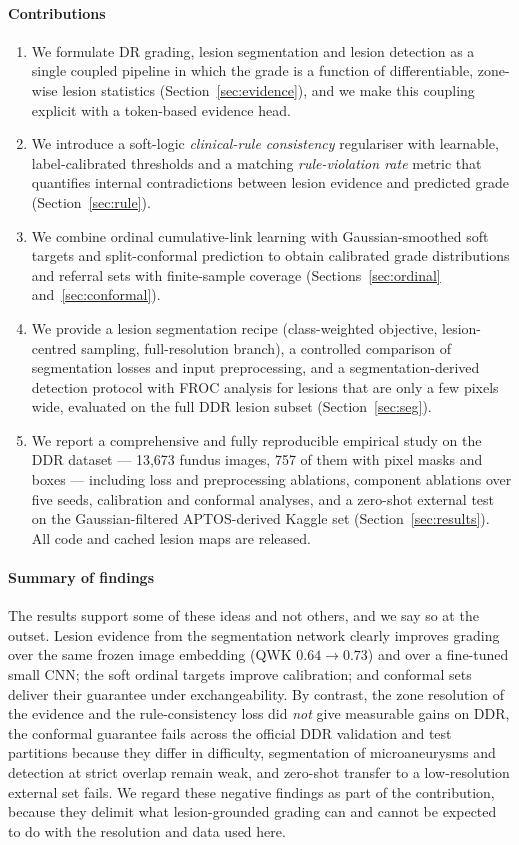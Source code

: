 \paragraph{Contributions}
\begin{enumerate}
\item We formulate DR grading, lesion segmentation and lesion detection as a single coupled pipeline in which the grade is a function of differentiable, zone-wise lesion statistics (Section~\ref{sec:evidence}), and we make this coupling explicit with a token-based evidence head.
\item We introduce a soft-logic \emph{clinical-rule consistency} regulariser with learnable, label-calibrated thresholds and a matching \emph{rule-violation rate} metric that quantifies internal contradictions between lesion evidence and predicted grade (Section~\ref{sec:rule}).
\item We combine ordinal cumulative-link learning with Gaussian-smoothed soft targets and split-conformal prediction to obtain calibrated grade distributions and referral sets with finite-sample coverage (Sections~\ref{sec:ordinal} and~\ref{sec:conformal}).
\item We provide a lesion segmentation recipe (class-weighted objective, lesion-centred sampling, full-resolution branch), a controlled comparison of segmentation losses and input preprocessing, and a segmentation-derived detection protocol with FROC analysis for lesions that are only a few pixels wide, evaluated on the full DDR lesion subset (Section~\ref{sec:seg}).
\item We report a comprehensive and fully reproducible empirical study on the DDR dataset \citep{li2019ddr} --- 13{,}673 fundus images, 757 of them with pixel masks and boxes --- including loss and preprocessing ablations, component ablations over five seeds, calibration and conformal analyses, and a zero-shot external test on the Gaussian-filtered APTOS-derived Kaggle set \citep{aptos2019,rath2020gaussian} (Section~\ref{sec:results}). All code and cached lesion maps are released.
\end{enumerate}

\paragraph{Summary of findings} The results support some of these ideas and not others, and we say so at the outset. Lesion evidence from the segmentation network clearly improves grading over the same frozen image embedding (QWK $0.64\to0.73$) and over a fine-tuned small CNN; the soft ordinal targets improve calibration; and conformal sets deliver their guarantee under exchangeability. By contrast, the zone resolution of the evidence and the rule-consistency loss did \emph{not} give measurable gains on DDR, the conformal guarantee fails across the official DDR validation and test partitions because they differ in difficulty, segmentation of microaneurysms and detection at strict overlap remain weak, and zero-shot transfer to a low-resolution external set fails. We regard these negative findings as part of the contribution, because they delimit what lesion-grounded grading can and cannot be expected to do with the resolution and data used here.

